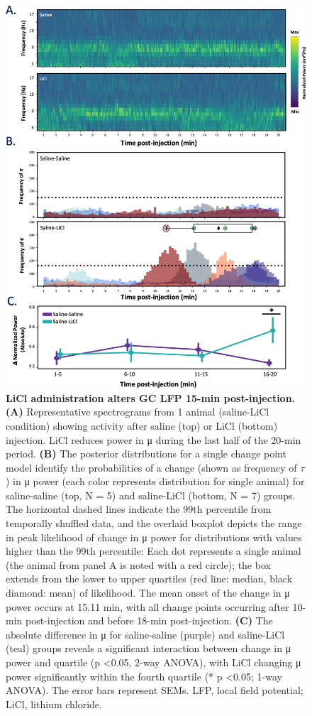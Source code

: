 \begin{refsection}
\begin{figure}
\centering
\includegraphics[width=0.7\linewidth]{stone_2022_figs/journal.pbio.3001537.g002.png}
\caption{\textbf{LiCl administration alters GC LFP 15-min post-injection.} \textbf{(A)} Representative spectrograms from 1 animal (saline-LiCl condition) showing activity after saline (top) or LiCl (bottom) injection. LiCl reduces power in μ during the last half of the 20-min period. \textbf{(B)} The posterior distributions for a single change point model identify the probabilities of a change (shown as frequency of \(\tau\)) in μ power (each color represents distribution for single animal) for saline-saline (top, N = 5) and saline-LiCl (bottom, N = 7) groups. The horizontal dashed lines indicate the 99th percentile from temporally shuffled data, and the overlaid boxplot depicts the range in peak likelihood of change in μ power for distributions with values higher than the 99th percentile: Each dot represents a single animal (the animal from panel A is noted with a red circle); the box extends from the lower to upper quartiles (red line: median, black diamond: mean) of likelihood. The mean onset of the change in μ power occurs at 15.11 min, with all change points occurring after 10-min post-injection and before 18-min post-injection. \textbf{(C)} The absolute difference in μ for saline-saline (purple) and saline-LiCl (teal) groups reveals a significant interaction between change in μ power and quartile (p \textless 0.05, 2-way ANOVA), with LiCl changing μ power significantly within the fourth quartile (* p \textless 0.05; 1-way ANOVA). The error bars represent SEMs. LFP, local field potential; LiCl, lithium chloride.
}
\label{fig:wrapfig}
\end{figure}


\end{refsection}
